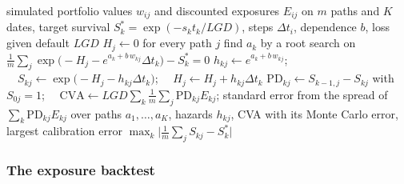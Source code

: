 \begin{algorithm}[htbp]
\caption{Calibration of the deterministic part $a(t)$ of the wrong-way hazard and the CVA with dependence (variant \texttt{wrong-way-risk}).}
\label{alg:ccr-wwr}
\begin{algorithmic}[1]
\Require simulated portfolio values $w_{ij}$ and discounted exposures $E_{ij}$ on $m$ paths and $K$ dates, target survival $S^\ast_k=\exp(-s_kt_k/LGD)$, steps $\Delta t_i$, dependence $b$, loss given default $LGD$
\State $H_{j}\leftarrow0$ for every path $j$ 
  \State find $a_k$ by a root search on $\frac{1}{m}\sum_j\exp\big(-H_j-e^{a_k+b\,w_{kj}}\Delta t_k\big)-S^\ast_k=0$ 
  \State $h_{kj}\leftarrow e^{a_k+b\,w_{kj}}$; $\quad S_{kj}\leftarrow\exp\big(-H_j-h_{kj}\Delta t_k\big)$; $\quad H_j\leftarrow H_j+h_{kj}\Delta t_k$
\EndFor
\State $\mathrm{PD}_{kj}\leftarrow S_{k-1,j}-S_{kj}$ with $S_{0j}=1$; $\quad\mathrm{CVA}\leftarrow LGD\sum_k\frac{1}{m}\sum_j\mathrm{PD}_{kj}E_{kj}$; standard error from the spread of $\sum_k\mathrm{PD}_{kj}E_{kj}$ over paths
\Ensure $a_1,\dots,a_K$, hazards $h_{kj}$, CVA with its Monte Carlo error, largest calibration error $\max_k\big|\frac1m\sum_jS_{kj}-S^\ast_k\big|$
\end{algorithmic}
\end{algorithm}

\subsubsection{The exposure backtest}

